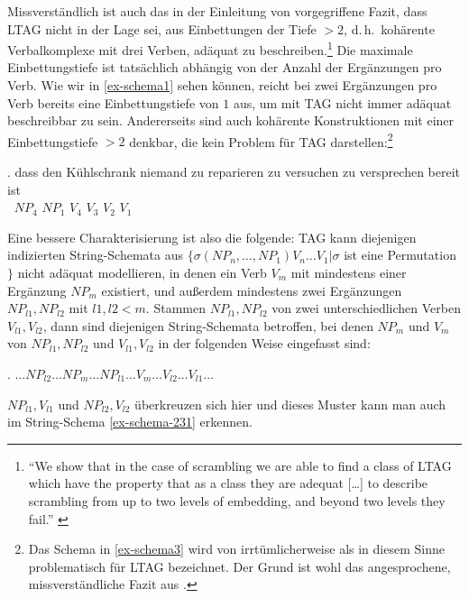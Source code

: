 Missverständlich ist auch das in der Einleitung von \cite{Joshi:Becker:Rambow:00} vorgegriffene Fazit, dass LTAG nicht in der Lage sei,  aus Einbettungen der Tiefe $>2$, d.\,h.\ kohärente Verbalkomplexe mit drei Verben, adäquat zu beschreiben.\footnote{"`We show that in the case of scrambling we are able to find a class of LTAG which have the property that as a class they are adequat [\ldots] to describe scrambling from up to two levels of embedding, and beyond two levels they fail."' \citep[167]{Joshi:Becker:Rambow:00}} Die maximale Einbettungstiefe ist tatsächlich abhängig von der Anzahl der Ergänzungen pro Verb. Wie wir in \ref{ex-schema1} sehen können, reicht bei zwei Ergänzungen pro Verb bereits eine Einbettungstiefe von $1$ aus, um mit TAG nicht immer adäquat beschreibbar zu sein. Andererseits sind auch kohärente Konstruktionen mit einer Einbettungstiefe $>2$ denkbar, die kein Problem für TAG darstellen:\footnote{Das Schema in \ref{ex-schema3} wird von \citet[190]{Kallmeyer:05} irrtümlicherweise als in diesem Sinne problematisch für LTAG bezeichnet. Der Grund ist wohl das angesprochene, missverständliche Fazit aus \citet[167]{Joshi:Becker:Rambow:00}.} 

\exg. dass {den Kühlschrank} niemand {zu reparieren} {zu versuchen} {zu versprechen} {bereit ist} \\
$~$ $\mathit{NP}_4$ $\mathit{NP}_1$ $V_4$ $V_3$ $V_2$ $V_1$ \\
\label{ex-schema3} 

Eine bessere Charakterisierung ist also die folgende: TAG kann diejenigen indizierten String-Schemata aus $\{ \sigma(\mathit{NP}_n, \ldots, \mathit{NP}_1) V_n \ldots V_1 | \sigma$ ist eine Permutation $\}$ nicht adäquat modellieren, in denen ein Verb $V_m$ mit mindestens einer Ergänzung $\mathit{NP}_m$ existiert, und au\ss erdem mindestens zwei Ergänzungen $\mathit{NP}_{l1}, \mathit{NP}_{l2}$ mit $l1,l2 < m$. Stammen $\mathit{NP}_{l1}, \mathit{NP}_{l2}$ von zwei unterschiedlichen Verben $V_{l1}, V_{l2}$, dann sind diejenigen String-Schemata betroffen, bei denen $\mathit{NP}_m$ und $V_m$ von $\mathit{NP}_{l1}, \mathit{NP}_{l2}$ und $V_{l1}, V_{l2}$ in der folgenden Weise eingefasst sind: 

\ex. $\ldots \mathit{NP}_{l2} \ldots \mathit{NP}_m \ldots \mathit{NP}_{l1} \ldots V_m \ldots V_{l2} \ldots V_{l1} \ldots$\label{ex-schema-abstrakt} 

$\mathit{NP}_{l1}, V_{l1}$ und $\mathit{NP}_{l2}, V_{l2}$ überkreuzen sich hier und dieses Muster kann man auch im String-Schema \ref{ex-schema-231} erkennen. 


